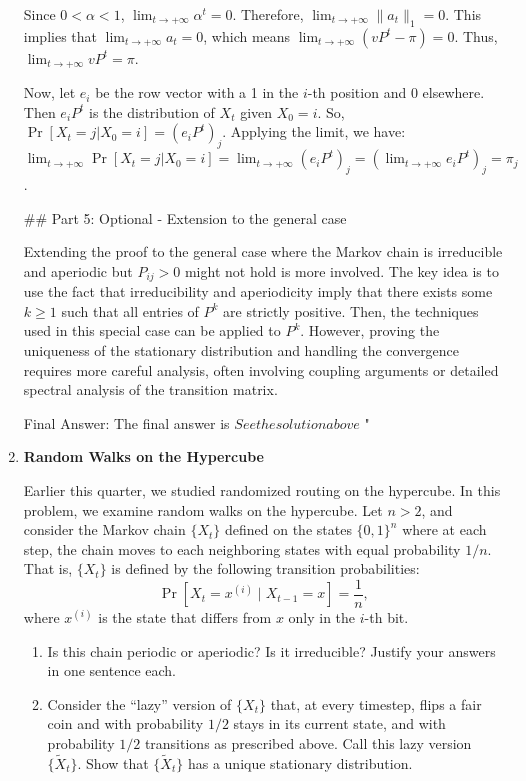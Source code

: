 \begin{enumerate}
\begin{shaded}
Since $0 < \alpha < 1$, $\lim_{t\to+\infty} \alpha^t = 0$. Therefore, $\lim_{t\to+\infty} \|a_t\|_1 = 0$.
This implies that $\lim_{t\to+\infty} a_t = 0$, which means $\lim_{t\to+\infty} (v P^t - \pi) = 0$.
Thus, $\lim_{t\to+\infty} v P^t = \pi$.

Now, let $e_i$ be the row vector with a 1 in the $i$-th position and 0 elsewhere. Then $e_i P^t$ is the distribution of $X_t$ given $X_0 = i$.
So, $\Pr[X_t = j|X_0 = i] = (e_i P^t)_j$.
Applying the limit, we have:
$\lim_{t\to+\infty}\Pr[X_t = j|X_0 = i] = \lim_{t\to+\infty} (e_i P^t)_j = (\lim_{t\to+\infty} e_i P^t)_j = \pi_j$.

## Part 5: Optional - Extension to the general case

Extending the proof to the general case where the Markov chain is irreducible and aperiodic but $P_{ij} > 0$ might not hold is more involved. The key idea is to use the fact that irreducibility and aperiodicity imply that there exists some $k \ge 1$ such that all entries of $P^k$ are strictly positive. Then, the techniques used in this special case can be applied to $P^k$. However, proving the uniqueness of the stationary distribution and handling the convergence requires more careful analysis, often involving coupling arguments or detailed spectral analysis of the transition matrix.

Final Answer: The final answer is $\boxed{See the solution above}$
"

\fi
\end{shaded}
\fi

\item {} \textbf{Random Walks on the Hypercube} 

Earlier this quarter, we studied randomized routing on the hypercube. In this problem, we examine random walks on the hypercube. Let $n > 2$, and consider the Markov chain $\{X_t\}$ defined on the states $\{0,1\}^n$ where at each step, the chain moves to each neighboring states with equal probability $1/n$.  That is, $\{X_t\}$ is defined by the following transition probabilities: 
    \[\Pr[X_t = x^{(i)} \mid X_{t-1} = x] = \frac{1}{n},
    \]
    where \( x^{(i)} \) is the state that differs from \( x \) only in the \( i \)-th bit.
\begin{enumerate}

\item {} 
Is this chain periodic or aperiodic?   Is it irreducible?  
Justify your answers in one sentence each.

\item  {} Consider the ``lazy'' version of $\{X_t\}$ that, at every timestep, flips a fair coin and with probability $1/2$ stays in its current state, and with probability $1/2$ transitions as prescribed above.  Call this lazy version $\{\tilde{X}_t\}$. Show that $\{\tilde{X}_t\}$ has a unique stationary distribution. 


\end{enumerate}
\end{enumerate}
